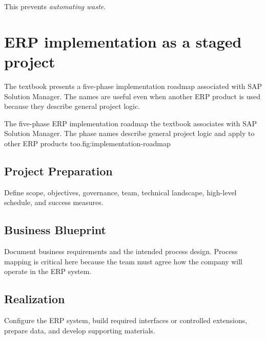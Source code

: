 This prevents \emph{automating waste}.

\section{ERP implementation as a staged project}

The textbook presents a five-phase implementation roadmap associated with SAP Solution Manager. The names are useful even when another ERP product is used because they describe general project logic.

\begin{utpfig}{The five-phase ERP implementation roadmap the textbook associates with SAP Solution Manager. The phase names describe general project logic and apply to other ERP products too.}{fig:implementation-roadmap}
\end{utpfig}

\subsection{Project Preparation}
Define scope, objectives, governance, team, technical landscape, high-level schedule, and success measures.

\subsection{Business Blueprint}
Document business requirements and the intended process design. Process mapping is critical here because the team must agree how the company will operate in the ERP system.

\subsection{Realization}
Configure the ERP system, build required interfaces or controlled extensions, prepare data, and develop supporting materials.

